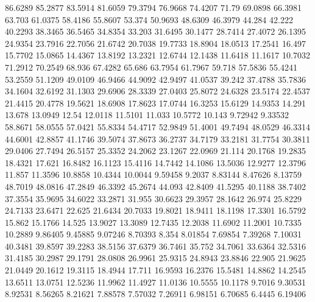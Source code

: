 86.6289      85.2877      83.5914      81.6059      79.3794      76.9668      74.4207      71.79      69.0898      66.3981      63.703      61.0375      58.4186      55.8607      53.374      50.9693      48.6309      46.3979      44.284      42.222      40.2293      38.3465      36.5465      34.8354      33.203      31.6495      30.1477      28.7414      27.4072      26.1395      24.9354      23.7916      22.7056      21.6742      20.7038      19.7733      18.8904      18.0513      17.2541      16.497      15.7702      15.0865      14.4367      13.8192      13.2321      12.6744      12.1438      11.6418      11.1617      10.7032      
71.2912      70.2549      68.936      67.4282      65.686      63.7954      61.7967      59.718      57.5836      55.4241      53.2559      51.1209      49.0109      46.9466      44.9092      42.9497      41.0537      39.242      37.4788      35.7836      34.1604      32.6192      31.1303      29.6906      28.3339      27.0403      25.8072      24.6328      23.5174      22.4537      21.4415      20.4778      19.5621      18.6908      17.8623      17.0744      16.3253      15.6129      14.9353      14.291      13.678      13.0949      12.54      12.0118      11.5101      11.033      10.5772      10.143      9.72942      9.33532      
58.8671      58.0555      57.0421      55.8334      54.4717      52.9849      51.4001      49.7494      48.0529      46.3314      44.6001      42.8857      41.1746      39.5074      37.8673      36.2737      34.7179      33.2181      31.7754      30.3811      29.0406      27.7494      26.5157      25.3352      24.2062      23.1267      22.0969      21.114      20.1768      19.2835      18.4321      17.621      16.8482      16.1123      15.4116      14.7442      14.1086      13.5036      12.9277      12.3796      11.857      11.3596      10.8858      10.4344      10.0044      9.59458      9.2037      8.83144      8.47626      8.13759      
48.7019      48.0816      47.2849      46.3392      45.2674      44.093      42.8409      41.5295      40.1188      38.7402      37.3554      35.9695      34.6022      33.2871      31.955      30.6623      29.3957      28.1642      26.974      25.8229      24.7133      23.6471      22.625      21.6434      20.7033      19.8021      18.9411      18.1198      17.3301      16.5792      15.862      15.1766      14.525      13.9027      13.3089      12.7435      12.2038      11.6902      11.2001      10.7335      10.2889      9.86405      9.45885      9.07246      8.70393      8.354      8.01854      7.69854      7.39268      7.10031      
40.3481      39.8597      39.2283      38.5156      37.6379      36.7461      35.752      34.7061      33.6364      32.5316      31.4185      30.2987      29.1791      28.0808      26.9961      25.9315      24.8943      23.8846      22.905      21.9625      21.0449      20.1612      19.3115      18.4944      17.711      16.9593      16.2376      15.5481      14.8862      14.2545      13.6511      13.0751      12.5236      11.9962      11.4927      11.0136      10.5555      10.1178      9.7016      9.30531      8.92531      8.56265      8.21621      7.88578      7.57032      7.26911      6.98151      6.70685      6.4445      6.19406      
